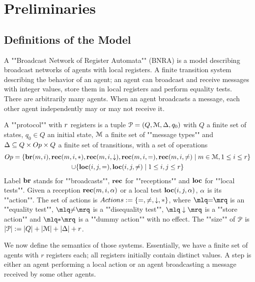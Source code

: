 \section{Preliminaries}
\label{sec:preliminaries}

\subsection{Definitions of the Model}
A ""Broadcast Network of Register Automata"" (BNRA) \cite{DelzannoST13} is a model describing broadcast networks of agents with local registers. A finite transition system describing the behavior of an agent; an agent can broadcast and receive messages with integer values, store them in local registers and perform equality tests. 
There are arbitrarily many agents. When an agent broadcasts a message, each other agent independently may or may not receive it. 

\begin{definition}[Protocols]
	A ""protocol"" with $r$ registers is a tuple $\mathcal{P} = (Q, \mathcal{M}, \Delta, q_0)$  with $Q$ a finite set of states, $q_0 \in Q$ an initial state, $\mathcal{M}$ a finite set of ""message types""  and $\transitions \subseteq Q \times \operations \times Q$ a finite set of transitions, with a set of operations 
	\begin{multline*}
	\operations = \set{\br{\amessage}{i}, \rec{\amessage}{i}{\dummyact}, \rec{\amessage}{i}{\enregact}, \rec{\amessage}{i}{\eqtestact}, \rec{\amessage}{i}{\diseqtestact} \mid \amessage \in \messages, 1 \leq i \leq \regnum} \\ \cup  
	\set{\loc{i}{j}{\eqtestact}, \loc{i}{j}{\diseqtestact} \mid 1 \leq i,j \leq \regnum}
	\end{multline*}	
	Label $\textbf{br}$ stands for ""broadcasts"", $\textbf{rec}$ for ""receptions"" and $\textbf{loc}$ for ""local tests"".
	Given a reception $\textbf{rec}(m, i, \alpha)$ or a local test $\textbf{loc}(i,j,\alpha)$, $\alpha$ is its ""action"". 
The set of actions is $\actions := \set{\eqtestact, \diseqtestact, \enregact, \dummyact}$, where 
$\quotemarks{\eqtestact}$ is an ""equality test"", $\quotemarks{\diseqtestact}$ is a ""disequality test"", $\quotemarks{\enregact}$ is a ""store action"" and $\quotemarks{\dummyact}$ is a ""dummy action"" with no effect.
The ""size"" of $\mathcal{P}$ is $|\mathcal{P}| := |Q| + |\mathcal{M}| + |\Delta| + r$.
\end{definition}

We now define the semantics of those systems. Essentially, we have a finite set of agents with $r$ registers each; all registers initially contain distinct values. A step is either an agent performing a local action or an agent broadcasting a message received by some other agents.


